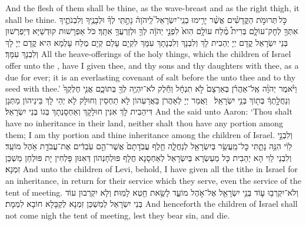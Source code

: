 {And the flesh of them shall be thine, as the wave-breast and as the right thigh, it shall be thine.}{}
{כֹּ֣ל \legarmeh  תְּרוּמֹ֣ת הַקֳּדָשִׁ֗ים אֲשֶׁ֨ר יָרִ֥ימוּ בְנֵֽי־יִשְׂרָאֵל֮ לַֽיהֹוָה֒ נָתַ֣תִּֽי לְךָ֗ וּלְבָנֶ֧יךָ וְלִבְנֹתֶ֛יךָ אִתְּךָ֖ לְחׇק־עוֹלָ֑ם בְּרִית֩ מֶ֨לַח עוֹלָ֥ם הִוא֙ לִפְנֵ֣י יְהֹוָ֔ה לְךָ֖ וּלְזַרְעֲךָ֥ אִתָּֽךְ׃
}
{כֹּל אַפְרָשׁוּת קוּדְשַׁיָּא דְּיַפְרְשׁוּן בְּנֵי יִשְׂרָאֵל קֳדָם יְיָ יְהַבִית לָךְ וְלִבְנָךְ וְלִבְנָתָךְ עִמָּךְ לִקְיָם עָלַם קְיָם מֶלַח עָלְמָא הִיא קֳדָם יְיָ לָךְ וְלִבְנָךְ עִמָּךְ׃}
{All the heave-offerings of the holy things, which the children of Israel offer unto the \lord, have I given thee, and thy sons and thy daughters with thee, as a due for ever; it is an everlasting covenant of salt before the \lord\space unto thee and to thy seed with thee.’}{}
{וַיֹּ֨אמֶר יְהֹוָ֜ה אֶֽל־אַהֲרֹ֗ן בְּאַרְצָם֙ לֹ֣א תִנְחָ֔ל וְחֵ֕לֶק לֹא־יִהְיֶ֥ה לְךָ֖ בְּתוֹכָ֑ם אֲנִ֤י חֶלְקְךָ֙ וְנַחֲלָ֣תְךָ֔ בְּת֖וֹךְ בְּנֵ֥י יִשְׂרָאֵֽל׃ \setuma 
{}}
{וַאֲמַר יְיָ לְאַהֲרֹן בַּאֲרַעְהוֹן לָא תַחְסֵין וְחוּלָק לָא יְהֵי לָךְ בֵּינֵיהוֹן מַתְּנָן דִּיהַבִית לָךְ אִנִּין חוּלָקָךְ וְאַחְסָנְתָךְ בְּגוֹ בְּנֵי יִשְׂרָאֵל׃}
{And the \lord\space said unto Aaron: ‘Thou shalt have no inheritance in their land, neither shalt thou have any portion among them; I am thy portion and thine inheritance among the children of Israel.}{}
{וְלִבְנֵ֣י לֵוִ֔י הִנֵּ֥ה נָתַ֛תִּי כׇּל־מַֽעֲשֵׂ֥ר בְּיִשְׂרָאֵ֖ל לְנַחֲלָ֑ה חֵ֤לֶף עֲבֹֽדָתָם֙ אֲשֶׁר־הֵ֣ם עֹֽבְדִ֔ים אֶת־עֲבֹדַ֖ת אֹ֥הֶל מוֹעֵֽד׃}
{וְלִבְנֵי לֵוִי הָא יְהַבִית כָּל מַעְשְׂרָא בְּיִשְׂרָאֵל לְאַחְסָנָא חֲלָף פּוּלְחָנְהוֹן דְּאִנּוּן פָּלְחִין יָת פּוּלְחַן מַשְׁכַּן זִמְנָא׃}
{And unto the children of Levi, behold, I have given all the tithe in Israel for an inheritance, in return for their service which they serve, even the service of the tent of meeting.}{}
{וְלֹא־יִקְרְב֥וּ ע֛וֹד בְּנֵ֥י יִשְׂרָאֵ֖ל אֶל־אֹ֣הֶל מוֹעֵ֑ד לָשֵׂ֥את חֵ֖טְא לָמֽוּת׃}
{וְלָא יִקְרְבוּן עוֹד בְּנֵי יִשְׂרָאֵל לְמַשְׁכַּן זִמְנָא לְקַבָּלָא חוֹבָא לִמְמָת׃}
{And henceforth the children of Israel shall not come nigh the tent of meeting, lest they bear sin, and die.}{}
